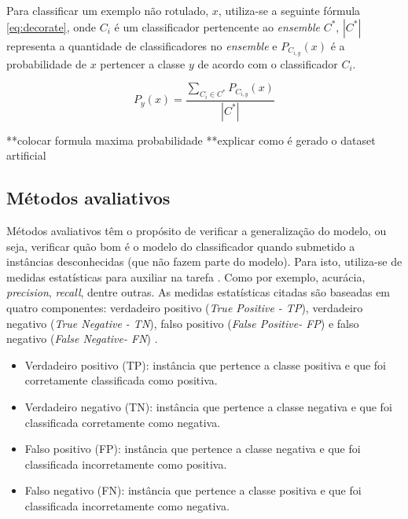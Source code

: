 Para classificar um exemplo não rotulado, $x$, utiliza-se a seguinte fórmula \ref{eq:decorate}, onde $C_{i}$ é um classificador pertencente ao \textit{ensemble} $C^*$, $|C^*|$ representa a quantidade de classificadores no \textit{ensemble} e $P_{C_{i,y}}(x)$ é a probabilidade de $x$ pertencer a classe $y$ de acordo com o classificador $C_{i}$.

\begin{equation}
  P_{y}(x) = \frac{\sum_{C_{i} \in C^*}P_{C_{i,y}}(x)}{|C^*|}
  \label{eq:decorate}
\end{equation}

**colocar formula maxima probabilidade
**explicar como é gerado o dataset artificial

\subsection{Métodos avaliativos}
\label{subsec:evaluationMethods}
Métodos avaliativos têm o propósito de verificar a generalização do modelo, ou seja, verificar quão bom é o modelo do classificador quando submetido a instâncias desconhecidas (que não fazem parte do modelo). Para isto, utiliza-se de medidas estatísticas para auxiliar na tarefa \cite{Witten:2005}. Como por exemplo, acurácia, \textit{precision}, \textit{recall}, dentre outras. As medidas estatísticas citadas são baseadas em quatro componentes: verdadeiro positivo (\textit{True Positive - TP}), verdadeiro negativo (\textit{True Negative - TN}), falso positivo (\textit{False Positive- FP}) e falso negativo (\textit{False Negative- FN}) \cite{Davis:2006}.

\begin{itemize}
\item Verdadeiro positivo (TP): instância que pertence a classe positiva e que foi corretamente classificada como positiva.
\item Verdadeiro negativo (TN): instância que pertence a classe negativa e que foi classificada corretamente como negativa.
\item Falso positivo (FP): instância que pertence a classe negativa e que foi classificada  incorretamente como positiva.
\item Falso negativo (FN): instância que pertence a classe positiva e que foi classificada incorretamente como negativa.
\end{itemize}

